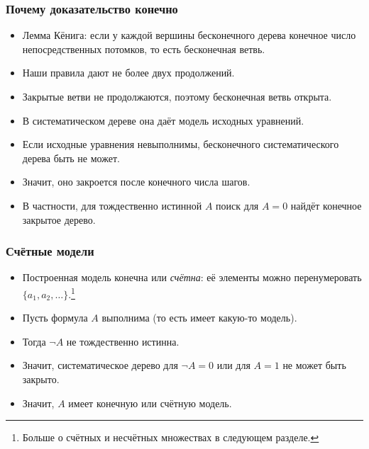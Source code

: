 \documentclass[10pt]{beamer}
\begin{document}
\begin{frame}
    \frametitle{Почему доказательство конечно}
    \begin{itemize}
        \item Лемма Кёнига: если у каждой вершины бесконечного дерева конечное число непосредственных потомков, то есть бесконечная ветвь.
        \pause
        \item Наши правила дают не более двух продолжений.
        \item Закрытые ветви не продолжаются, поэтому бесконечная ветвь открыта.
        \item В систематическом дереве она даёт модель исходных уравнений.
        \pause
        \item Если исходные уравнения невыполнимы, бесконечного систематического дерева быть не может.
        \item Значит, оно закроется после конечного числа шагов.
        \item В частности, для тождественно истинной $A$ поиск для $A=0$ найдёт конечное закрытое дерево.
    \end{itemize}
\end{frame}

\begin{frame}
    \frametitle{Счётные модели}
    \begin{itemize}
        \item Построенная модель конечна или \emph{счётна}: её элементы можно перенумеровать $\{a_1,a_2,\ldots\}$.\footnote{Больше о счётных и несчётных множествах в следующем разделе.}
        \item Пусть формула $A$ выполнима (то есть имеет какую-то модель). 
        \item Тогда $\neg A$ не тождественно истинна.
        \item Значит, систематическое дерево для $\neg A = 0$ или для $A = 1$ не может быть закрыто.
        \item Значит, $A$ имеет конечную или счётную модель.
    \end{itemize}
\end{frame}
\end{document}
